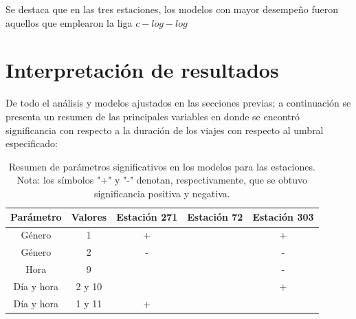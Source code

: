 \documentclass[9pt,twocolumn,twoside]{ilcss}
\begin{document}
Se destaca que en las tres estaciones, los modelos con mayor desempeño fueron aquellos que emplearon la liga $c-log-log$ 

\section{Interpretación de resultados}

De todo el análisis y modelos ajustados en las secciones previas; a continuación se presenta un resumen de las principales variables en donde se encontró significancia con respecto a la duración de los viajes con respecto al umbral especificado:

\begin{table}[tbhp]
\centering
\label{tab:param_resulta}
\begin{tabular}{@{}ccccc@{}}
\toprule
Parámetro & Valores & Estación 271 & Estación 72 & Estación 303 \\ \midrule
Género & 1 & + &  & + \\
Género & 2 & - &  & - \\
Hora & 9 &  &  & - \\
Día y hora & 2 y 10 &  &  & + \\
Día y hora & 1 y 11 & + &  &  \\ \bottomrule
\end{tabular}
\caption{Resumen de parámetros significativos en los modelos para las estaciones. Nota: los símbolos "+" y "-" denotan, respectivamente, que se obtuvo significancia positiva y negativa.}
\end{table}
\end{document}
